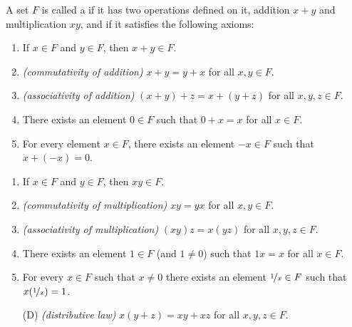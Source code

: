 \begin{defn}
A set $F$ is called a \emph{} if it has two operations
defined on it, addition $x+y$ and multiplication $xy$, and if it satisfies
the following axioms:
\begin{enumerate}[({A}1)]
\item
If $x \in F$ and $y \in F$, then $x+y \in F$.
\item
\emph{(commutativity of addition)}
$x+y = y+x$ for all $x,y \in F$.
\item
\emph{(associativity of addition)}
$(x+y)+z = x+(y+z)$ for all $x,y,z \in F$.
\item
There exists an element $0 \in F$ such that
$0+x = x$ for all $x \in F$.
\item
For every element $x\in F$, there exists an element $-x \in F$
such that $x + (-x) = 0$.
\end{enumerate}
\begin{enumerate}[({M}1)]
\item
If $x \in F$ and $y \in F$, then $xy \in F$.
\item
\emph{(commutativity of multiplication)}
$xy = yx$ for all $x,y \in F$.
\item
\emph{(associativity of multiplication)}
$(xy)z = x(yz)$ for all $x,y,z \in F$.
\item
There exists an element $1 \in F$ (and $1 \not= 0$) such that
$1x = x$ for all $x \in F$.
\item
For every $x\in F$ such that $x \not= 0$ there exists an element
$\nicefrac{1}{x} \in F$
such that $x(\nicefrac{1}{x}) = 1$.
\item[(D)]
\emph{(distributive law)} $x(y+z) = xy+xz$
for all $x,y,z \in F$.
\end{enumerate}
\end{defn}

